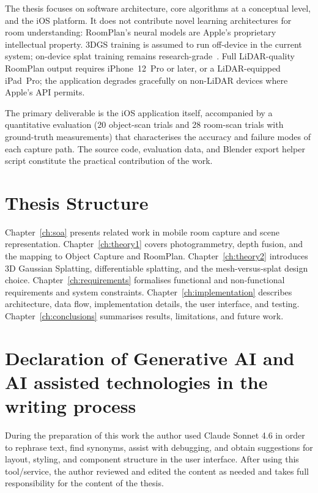 The thesis focuses on software architecture, core algorithms at a conceptual
level, and the iOS platform. It does not contribute novel learning
architectures for room understanding: RoomPlan's neural models are Apple's
proprietary intellectual property. 3DGS training is assumed to run off-device
in the current system; on-device splat training remains
research-grade~\cite{Guo26}. Full LiDAR-quality RoomPlan output requires
iPhone~12~Pro or later, or a LiDAR-equipped iPad~Pro; the application
degrades gracefully on non-LiDAR devices where Apple's API permits.

The primary deliverable is the iOS application itself, accompanied by a quantitative evaluation (20 object-scan trials and 28 room-scan trials with ground-truth measurements) that characterises the accuracy and failure modes of each capture path. The source code, evaluation data, and Blender export helper script constitute the practical contribution of the work.



\section{Thesis Structure}

Chapter~\ref{ch:soa} presents related work in mobile room capture and scene representation. Chapter~\ref{ch:theory1} covers photogrammetry, depth fusion, and the mapping to Object Capture and RoomPlan. Chapter~\ref{ch:theory2} introduces 3D Gaussian Splatting, differentiable splatting, and the mesh-versus-splat design choice. Chapter~\ref{ch:requirements} formalises functional and non-functional requirements and system constraints. Chapter~\ref{ch:implementation} describes architecture, data flow, implementation details, the user interface, and testing. Chapter~\ref{ch:conclusions} summarises results, limitations, and future work.

\section{Declaration of Generative AI and AI assisted technologies in the writing process}
During the preparation of this work the author used Claude Sonnet 4.6 in order to rephrase text, find synonyms, assist with debugging, and obtain suggestions for layout, styling, and component structure in the user interface. After using this tool/service, the author reviewed and edited the content as needed and takes full responsibility for the content of the thesis.
